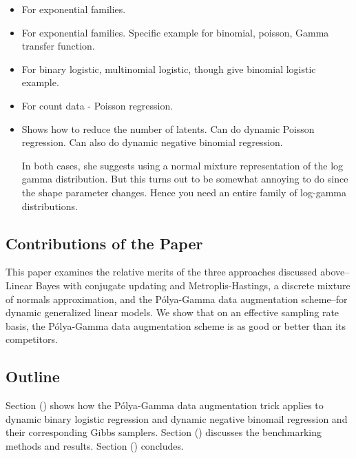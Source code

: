 \documentclass[11pt]{article}
\newcommand{\Polya}{P\'{o}lya}
\begin{document}
\begin{itemize}
\item \cite{west-etal-1985}

  For exponential families.

\item \cite{ravines-etal-2006}

  For exponential families.  Specific example for binomial, poisson, Gamma
  transfer function.

\item \cite{fruhwirth-schnatter-fruhwirth-2007}

  For binary logistic, multinomial logistic, though give binomial logistic example.

\item \cite{fruhwirth-schnatter-wagner-2006}

  For count data - Poisson regression.

\item \cite{fruhwirth-schnatter-etal-2009}

  Shows how to reduce the number of latents.  Can do dynamic Poisson regression.
  Can also do dynamic negative binomial regression.

  In both cases, she suggests using a normal mixture representation of the log
  gamma distribution.  But this turns out to be somewhat annoying to do since
  the shape parameter changes.  Hence you need an entire family of log-gamma
  distributions.

\end{itemize}

\subsection{Contributions of the Paper}

This paper examines the relative merits of the three approaches discussed
above--Linear Bayes with conjugate updating and Metroplis-Hastings, a discrete
mixture of normals approximation, and the \Polya-Gamma data augmentation
scheme--for dynamic generalized linear models.  We show that on an effective
sampling rate basis, the \Polya-Gamma data augmentation scheme is as good or
better than its competitors.

\subsection{Outline}

Section () shows how the \Polya-Gamma data augmentation trick applies to dynamic
binary logistic regression and dynamic negative binomail regression and their
corresponding Gibbs samplers.  Section () discusses the benchmarking methods and
results.  Section () concludes.
\end{document}
